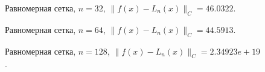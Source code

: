 \documentclass[12pt, a4paper]{article}
\begin{document}
\begin{figure}[h]
    \caption{Равномерная сетка, $n = 32$, $ \| f(x) - L_n(x)  \|_C = 46.0322 $.}
\end{figure}

\pagebreak


\begin{figure}[h]
    \caption{Равномерная сетка, $n = 64$, $ \| f(x) - L_n(x)  \|_C = 44.5913 $.}
\end{figure}

\begin{figure}[h]
    \caption{Равномерная сетка, $n = 128$, $ \| f(x) - L_n(x)  \|_C = 2.34923e+19 $.}
\end{figure}
\end{document}
